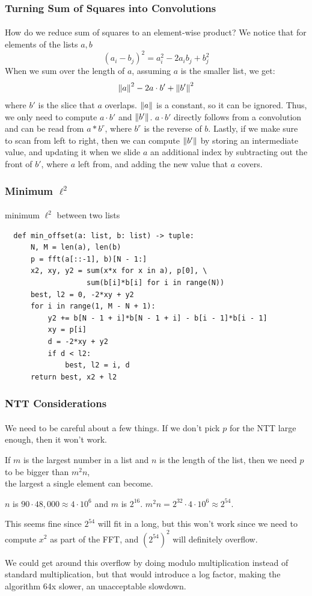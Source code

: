 \documentclass{beamer}                             %
\begin{document}
\begin{frame}
\frametitle{Turning Sum of Squares into Convolutions}
\framesubtitle{}
How do we reduce sum of squares to an element-wise product?
\pause
We notice that for elements of the lists \( a, b \)
\[ (a_i - b_j)^2 = a_i^2 - 2a_i b_j + b_j^2 \]
\pause 
When we sum over the length of \( a \),
assuming \( a \) is the smaller list, we get:
\[ \norm{a}^2 - 2 a \cdot b' + \norm{b'}^2 \] 
where \( b' \) is the slice that \( a \) overlaps.
\pause
\( \norm{a} \) is a constant, so it can be ignored.
Thus, we only need to compute \( a \cdot b' \) and \( \norm{b'} \).
\pause
\( a \cdot b' \) directly follows from a convolution and
can be read from \( a * b^r \), where \( b^r \) is the reverse of \( b \).
\pause
Lastly, if we make sure to scan from left to right, then we can compute
\( \norm{b'} \) by storing an intermediate value, and updating it when we slide 
\( a \) an additional index by subtracting out the front of \( b' \), where
\( a \) left from, and adding the new value that \( a \) covers.
\end{frame}

\begin{frame}[fragile]
\frametitle{Minimum \( \ell^2 \)}
\framesubtitle{}
\begin{algorithm}[H]
  \caption{minimum \( \ell^2 \) between two lists}
  \begin{verbatim}
  def min_offset(a: list, b: list) -> tuple:
      N, M = len(a), len(b)
      p = fft(a[::-1], b)[N - 1:]
      x2, xy, y2 = sum(x*x for x in a), p[0], \
                   sum(b[i]*b[i] for i in range(N))
      best, l2 = 0, -2*xy + y2
      for i in range(1, M - N + 1):
          y2 += b[N - 1 + i]*b[N - 1 + i] - b[i - 1]*b[i - 1]
          xy = p[i]
          d = -2*xy + y2
          if d < l2:
              best, l2 = i, d
      return best, x2 + l2
  \end{verbatim}
\end{algorithm}
\end{frame}

\begin{frame}
\frametitle{NTT Considerations}
\framesubtitle{}
We need to be careful about a few things. If we don't pick \( p \) for the NTT
large enough, then it won't work. \pause

If \( m \) is the largest number in a list
and \( n \) is the length of the list, then we need \( p \) to be bigger than
\( m^2 n \), \\ the largest a single element can become. \pause

\( n \) is \( 90 \cdot 48,000 \approx 4 \cdot 10^6 \) and \( m \) is
\( 2^{16} \). \( m^2 n = 2^{32} \cdot 4 \cdot 10^6 \approx 2^{54} \). \pause

This seems fine since \( 2^{54} \) will fit in a long, but this won't work
since we need to compute \( x^2 \) as part of the FFT, and \( (2^{54})^2 \)
will definitely overflow. \pause

We could get around this overflow by doing modulo
multiplication instead of standard multiplication, but that would introduce
a log factor, making the algorithm 64x slower, an unacceptable slowdown.
\end{frame}
\end{document}
